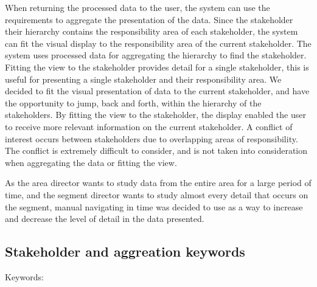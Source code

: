 When returning the processed data to the user, the system can use the 
requirements to aggregate the presentation of the data. Since the stakeholder 
their hierarchy contains the responsibility area of each stakeholder, the 
system can fit the visual display to the responsibility area of the current 
stakeholder. The system uses processed data for aggregating the hierarchy to 
find the stakeholder. Fitting the view to the stakeholder provides detail for 
a single stakeholder, this is useful for presenting a single stakeholder and 
their responsibility area.
We decided to fit the visual presentation of data 
to the current stakeholder, and have the opportunity to jump, back and forth, 
within the hierarchy of the stakeholders. By fitting the view to the 
stakeholder, the display enabled the user to receive more relevant information 
on the current stakeholder. A conflict of interest occurs between stakeholders 
due to overlapping areas of responsibility. The conflict is extremely difficult 
to consider, and is not taken into consideration when aggregating the data or 
fitting the view.

As the area director wants to study data from the entire area for a large 
period of time, and the segment director wants to study almost every detail 
that occurs on the segment, manual navigating in time was decided to use as a 
way to increase and decrease the level of detail in the data presented.

\subsection{Stakeholder and aggreation keywords} %
\label{sub:stakeholder_and_aggreation_keywords}
Keywords:

